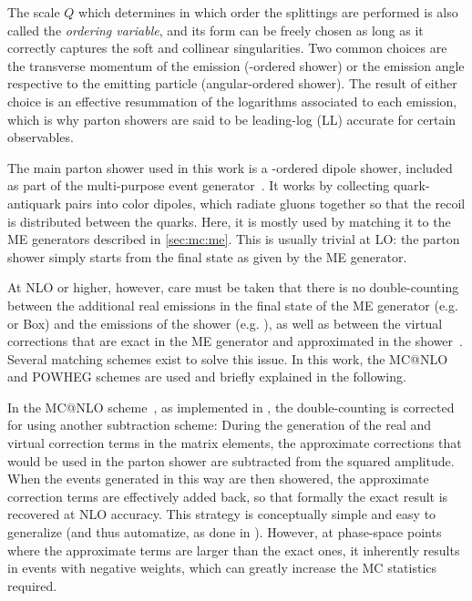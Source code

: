 The scale $Q$ which determines in which order the splittings are performed is also called the \textit{ordering variable}, and its form can be freely chosen as long as it correctly captures the soft and collinear singularities. Two common choices are the transverse momentum of the emission (\pt-ordered shower) or the emission angle respective to the emitting particle (angular-ordered shower). The result of either choice is an effective resummation of the logarithms associated to each emission, which is why parton showers are said to be leading-log (LL) accurate for certain observables.

The main parton shower used in this work is a \pt-ordered dipole shower, included as part of the \pythia multi-purpose event generator~\cite{Pythia:2015,Pythia:2022}. It works by collecting quark-antiquark pairs into color dipoles, which radiate gluons together so that the recoil is distributed between the quarks. Here, it is mostly used by matching it to the ME generators described in \cref{sec:mc:me}. This is usually trivial at LO: the parton shower simply starts from the final state as given by the ME generator.

At NLO or higher, however, care must be taken that there is no double-counting between the additional real emissions in the final state of the ME generator (e.g. \amcatnlo or \powheg Box) and the emissions of the shower (e.g. \pythia), as well as between the virtual corrections that are exact in the ME generator and approximated in the shower~\cite{Skands:2012ts}. Several matching schemes exist to solve this issue. In this work, the MC@NLO and POWHEG schemes are used and briefly explained in the following.

In the MC@NLO scheme~\cite{Frixione:2002ik}, as implemented in \amcatnlo, the double-counting is corrected for using another subtraction scheme: During the generation of the real and virtual correction terms in the matrix elements, the approximate corrections that would be used in the parton shower are subtracted from the squared amplitude. When the events generated in this way are then showered, the approximate correction terms are effectively added back, so that formally the exact result is recovered at NLO accuracy. This strategy is conceptually simple and easy to generalize (and thus automatize, as done in \amcatnlo). However, at phase-space points where the approximate terms are larger than the exact ones, it inherently results in events with negative weights, which can greatly increase the MC statistics required.

